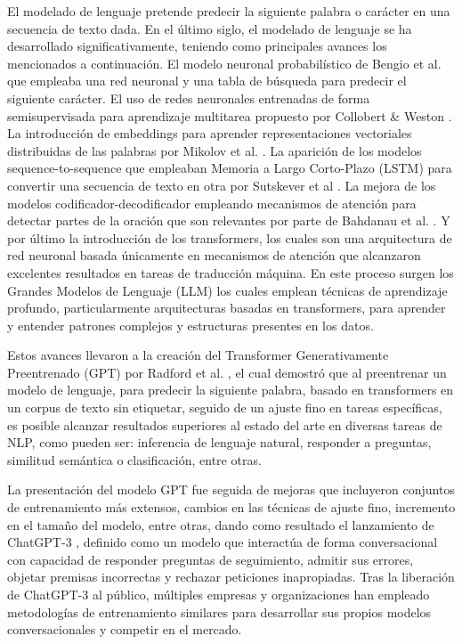 El modelado de lenguaje pretende predecir la siguiente palabra o carácter en una
secuencia de texto dada. En el último siglo, el modelado de lenguaje se ha
desarrollado significativamente, teniendo como principales avances los mencionados
a continuación. El modelo neuronal probabilístico de Bengio et al. \cite{bengio_neural_2003}
que empleaba una red neuronal y una tabla de búsqueda para predecir el siguiente carácter.
El uso de redes neuronales entrenadas de forma semisupervisada para aprendizaje
multitarea propuesto por Collobert \& Weston \cite{collobert_unified_2008}. La
introducción de embeddings para aprender representaciones vectoriales distribuidas
de las palabras por Mikolov et al. \cite{mikolov_distributed_2013}.
La aparición de los modelos sequence-to-sequence que empleaban Memoria a
Largo Corto-Plazo (LSTM) para convertir una secuencia de texto en otra por
Sutskever et al \cite{sutskever_sequence_2014}. La mejora de los modelos
codificador-decodificador empleando mecanismos de atención para detectar partes de la
oración que son relevantes por parte de Bahdanau et al. \cite{bahdanau_neural_2016}.
Y por último la introducción de los transformers, los cuales
son una arquitectura de red neuronal basada únicamente en mecanismos de atención
\cite{vaswani_attention_2017} que alcanzaron excelentes resultados en tareas de traducción
máquina. En este proceso surgen los Grandes Modelos de Lenguaje (LLM) los cuales
emplean técnicas de aprendizaje profundo, particularmente arquitecturas basadas
en transformers, para aprender y entender patrones complejos y estructuras presentes
en los datos.

Estos avances llevaron a la creación del Transformer Generativamente Preentrenado
(GPT) por Radford et al. \cite{radford_improving_2018}, el cual demostró que al
preentrenar un modelo de lenguaje, para predecir la siguiente palabra, basado en
transformers en un corpus de texto sin etiquetar, seguido de un ajuste fino en tareas
específicas, es posible alcanzar resultados superiores al estado del arte en diversas
tareas de NLP, como pueden ser: inferencia de lenguaje natural, responder a preguntas,
similitud semántica o clasificación, entre otras.

La presentación del modelo GPT fue seguida de mejoras que incluyeron conjuntos de
entrenamiento más extensos, cambios en las técnicas de ajuste fino, incremento en
el tamaño del modelo, entre otras, dando como resultado el lanzamiento de
ChatGPT-3 \cite{openai_introducing_2022}, definido como un modelo que interactúa de forma
conversacional con capacidad de responder preguntas de seguimiento, admitir sus
errores, objetar premisas incorrectas y rechazar peticiones inapropiadas. Tras
la liberación de ChatGPT-3 al público, múltiples empresas y organizaciones han
empleado metodologías de entrenamiento similares para desarrollar sus propios
modelos conversacionales y competir en el mercado.

